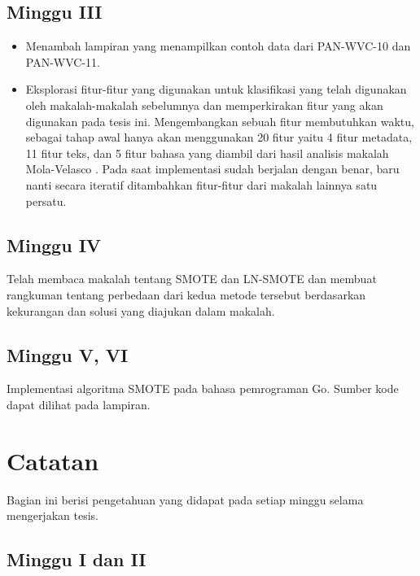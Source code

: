 \subsection{Minggu III}

\begin{itemize}
	\item Menambah lampiran yang menampilkan contoh data dari PAN-WVC-10 dan PAN-WVC-11.
	\item Eksplorasi fitur-fitur yang digunakan untuk klasifikasi yang telah digunakan oleh makalah-makalah sebelumnya dan memperkirakan fitur yang akan digunakan pada tesis ini.
Mengembangkan sebuah fitur membutuhkan waktu, sebagai tahap awal hanya akan menggunakan 20 fitur yaitu 4 fitur metadata, 11 fitur teks, dan 5 fitur bahasa yang diambil dari hasil analisis makalah Mola-Velasco \cite{mola2012wikipedia}. Pada saat implementasi sudah berjalan dengan benar, baru nanti secara iteratif ditambahkan fitur-fitur dari makalah lainnya satu persatu.
\end{itemize}

\subsection{Minggu IV}

Telah membaca makalah tentang SMOTE \cite{chawla2002smote} dan LN-SMOTE \cite{maciejewski2011local} dan membuat rangkuman tentang perbedaan dari kedua metode tersebut berdasarkan kekurangan dan solusi yang diajukan dalam makalah.

\subsection{Minggu V, VI}

Implementasi algoritma SMOTE pada bahasa pemrograman Go. Sumber kode dapat dilihat pada lampiran.


\newpage
\section{Catatan} \label{sec:catatan}

Bagian ini berisi pengetahuan yang didapat pada setiap minggu selama mengerjakan tesis.

\subsection{Minggu I dan II}


